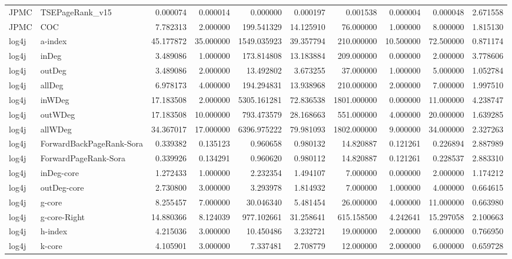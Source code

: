 \begin{tabular}{llrrrrrrrr}
JPMC & TSEPageRank_v15 & 0.000074 & 0.000014 & 0.000000 & 0.000197 & 0.001538 & 0.000004 & 0.000048 & 2.671558 \\
JPMC & COC & 7.782313 & 2.000000 & 199.541329 & 14.125910 & 76.000000 & 1.000000 & 8.000000 & 1.815130 \\
log4j & a-index & 45.177872 & 35.000000 & 1549.035923 & 39.357794 & 210.000000 & 10.500000 & 72.500000 & 0.871174 \\
log4j & inDeg & 3.489086 & 1.000000 & 173.814808 & 13.183884 & 209.000000 & 0.000000 & 2.000000 & 3.778606 \\
log4j & outDeg & 3.489086 & 2.000000 & 13.492802 & 3.673255 & 37.000000 & 1.000000 & 5.000000 & 1.052784 \\
log4j & allDeg & 6.978173 & 4.000000 & 194.294831 & 13.938968 & 210.000000 & 2.000000 & 7.000000 & 1.997510 \\
log4j & inWDeg & 17.183508 & 2.000000 & 5305.161281 & 72.836538 & 1801.000000 & 0.000000 & 11.000000 & 4.238747 \\
log4j & outWDeg & 17.183508 & 10.000000 & 793.473579 & 28.168663 & 551.000000 & 4.000000 & 20.000000 & 1.639285 \\
log4j & allWDeg & 34.367017 & 17.000000 & 6396.975222 & 79.981093 & 1802.000000 & 9.000000 & 34.000000 & 2.327263 \\
log4j & ForwardBackPageRank-Sora & 0.339382 & 0.135123 & 0.960658 & 0.980132 & 14.820887 & 0.121261 & 0.226894 & 2.887989 \\
log4j & ForwardPageRank-Sora & 0.339926 & 0.134291 & 0.960620 & 0.980112 & 14.820887 & 0.121261 & 0.228537 & 2.883310 \\
log4j & inDeg-core & 1.272433 & 1.000000 & 2.232354 & 1.494107 & 7.000000 & 0.000000 & 2.000000 & 1.174212 \\
log4j & outDeg-core & 2.730800 & 3.000000 & 3.293978 & 1.814932 & 7.000000 & 1.000000 & 4.000000 & 0.664615 \\
log4j & g-core & 8.255457 & 7.000000 & 30.046340 & 5.481454 & 26.000000 & 4.000000 & 11.000000 & 0.663980 \\
log4j & g-core-Right & 14.880366 & 8.124039 & 977.102661 & 31.258641 & 615.158500 & 4.242641 & 15.297058 & 2.100663 \\
log4j & h-index & 4.215036 & 3.000000 & 10.450486 & 3.232721 & 19.000000 & 2.000000 & 6.000000 & 0.766950 \\
log4j & k-core & 4.105901 & 3.000000 & 7.337481 & 2.708779 & 12.000000 & 2.000000 & 6.000000 & 0.659728 \\

\end{tabular}
